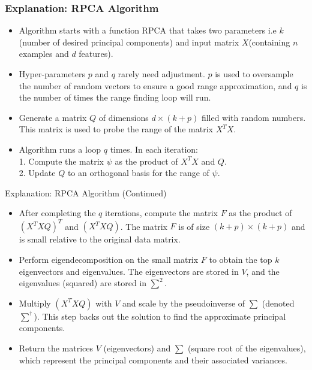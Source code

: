 \documentclass{beamer}
\begin{document}
\begin{frame}
\frametitle{Explanation: RPCA Algorithm}
\begin{itemize}
    \item Algorithm starts with a function RPCA that takes two parameters i.e $k$(number of desired principal components) and input matrix $X$(containing $n$ examples and $d$ features).
    \item Hyper-parameters $p$ and $q$ rarely need adjustment. $p$ is used to oversample the number of random vectors to ensure a good range approximation, and $q$ is the number of times the range finding loop will run.
    \item Generate a matrix $Q$ of dimensions $d \times (k + p)$ filled with random numbers. This matrix is used to probe the range of the matrix $X^T X$.
    \item Algorithm runs a loop $q$ times. In each iteration:\\
    1. Compute the matrix $\psi$ as the product of $X^T X$ and $Q$.\\
    2. Update $Q$ to an orthogonal basis for the range of $\psi$.

\end{itemize}
\end{frame}

\begin{frame}{Explanation: RPCA Algorithm (Continued)}
    \begin{itemize}
        \item After completing the $q$ iterations, compute the matrix $F$ as the product of $(X^T XQ)^T$ and $(X^T XQ)$. The matrix $F$ is of size $(k + p) \times (k + p)$ and is small relative to the original data matrix.
        \item Perform eigendecomposition on the small matrix $F$ to obtain the top $k$ eigenvectors and eigenvalues. The eigenvectors are stored in $V$, and the eigenvalues (squared) are stored in $\sum^2$.
        \item  Multiply $(X^T XQ)$ with $V$ and scale by the pseudoinverse of $\sum$ (denoted $\sum^\dagger$). This step backs out the solution to find the approximate principal components.
        \item Return the matrices $V$ (eigenvectors) and $\sum$ (square root of the eigenvalues), which represent the principal components and their associated variances.
    \end{itemize}
\end{frame}
\end{document}
